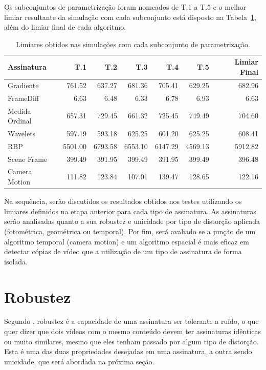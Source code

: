 Os subconjuntos de parametrização foram nomeados de T.1 a T.5 e o melhor limiar resultante da simulação com cada subconjunto está disposto na Tabela~\ref{tab:limiares}, além do limiar final de cada algoritmo.

\begin{table}[h]
	\caption{Limiares obtidos nas simulações com cada subconjunto de parametrização.}
	\label{tab:limiares}
	\begin{tabular}{|l|r|r|r|r|r|r|}
		\hline
		\textbf{Assinatura} & \textbf{T.1} & \textbf{T.2} & \textbf{T.3} & \textbf{T.4} & \textbf{T.5} & \textbf{Limiar Final}\\ \hline
		Gradiente & 761.52 & 637.27 & 681.36 & 705.41 & 629.25 & 682.96\\ \hline
		FrameDiff & 6.63 & 6.48 & 6.33 & 6.78 & 6.93 & 6.63\\ \hline
		Medida Ordinal & 657.31 & 729.45 & 661.32 & 725.45 & 749.49 & 704.60\\ \hline
		Wavelets & 597.19 & 593.18 & 625.25 & 601.20 & 625.25 & 608.41\\ \hline
		RBP & 5501.00 & 6793.58 & 6553.10 & 6147.29 & 4569.13 & 5912.82\\ \hline
		Scene Frame & 399.49 & 391.95 & 399.49 & 391.95 & 399.49 & 396.48\\ \hline
		Camera Motion & 111.82 & 123.84 & 107.01 & 139.47 & 128.65 & 122.16\\ \hline
	\end{tabular}
\end{table}

Na sequência, serão discutidos os resultados obtidos nos testes utilizando os limiares definidos na etapa anterior para cada tipo de assinatura. As assinaturas serão analisadas quanto a sua robustez e unicidade por tipo de distorção aplicada (fotométrica, geométrica ou temporal). Por fim, será avaliado se a junção de um algoritmo temporal (camera motion) e um algoritmo espacial é mais eficaz em detectar cópias de vídeo que a utilização de um tipo de assinatura de forma isolada. 

\section{Robustez}

Segundo \citeauthor{hua2004robust}, robustez é a capacidade de uma assinatura ser tolerante a ruído, o que quer dizer que dois vídeos com o mesmo conteúdo devem ter assinaturas idênticas ou muito similares, mesmo que eles tenham passado por algum tipo de distorção. Esta é uma das duas propriedades desejadas em uma assinatura, a outra sendo unicidade, que será abordada na próxima seção.

